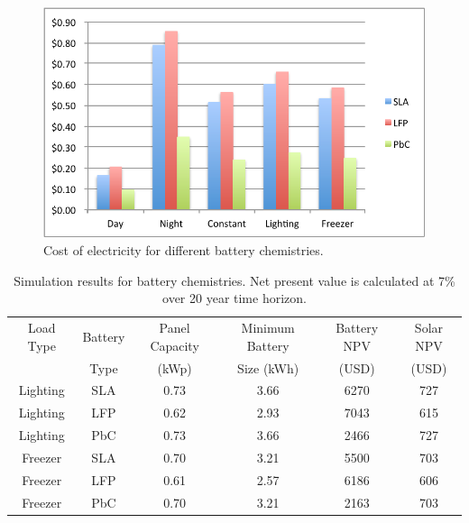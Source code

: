 \documentclass[conference]{IEEEtran}
\begin{document}
\begin{figure}[]
\begin{center}
\includegraphics[width=\columnwidth]{figures/battery.pdf}
\end{center}
\caption{Cost of electricity for different battery chemistries.}
\label{fig_battery}
\end{figure}


\begin{table}[!t]
\centering
\begin{tabular}{ c c c c c c }
Load Type & Battery & Panel Capacity & Minimum Battery & Battery NPV & Solar NPV \\
          & Type    & (kWp)          & Size (kWh)      & (USD)       & (USD)     \\
\hline
%
%

Lighting    & SLA & 0.73 & 3.66 & 6270 & 727 \\
Lighting    & LFP & 0.62 & 2.93 & 7043 & 615 \\
Lighting    & PbC & 0.73 & 3.66 & 2466 & 727 \\

Freezer     & SLA & 0.70 & 3.21 & 5500 & 703 \\
Freezer     & LFP & 0.61 & 2.57 & 6186 & 606 \\
Freezer     & PbC & 0.70 & 3.21 & 2163 & 703 \\

\end{tabular}
\caption{Simulation results for battery chemistries.
Net present value is calculated at 7\% over 20 year
time horizon.}
\label{table_battery}
\end{table}
\end{document}
